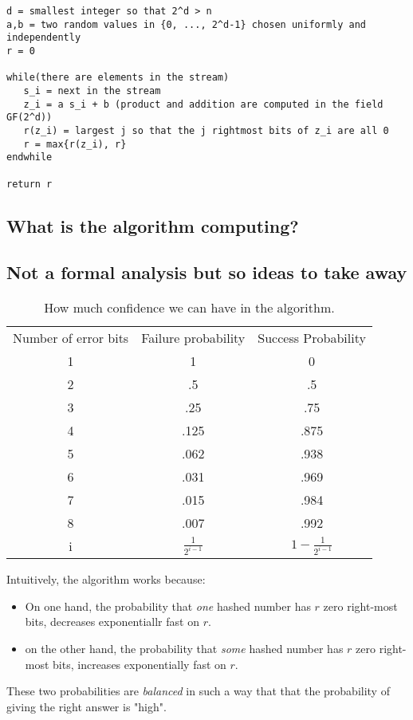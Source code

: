 \documentclass[12pt]{article}
\begin{document}
\begin{verbatim}
d = smallest integer so that 2^d > n
a,b = two random values in {0, ..., 2^d-1} chosen uniformly and independently
r = 0

while(there are elements in the stream)
   s_i = next in the stream
   z_i = a s_i + b (product and addition are computed in the field GF(2^d))
   r(z_i) = largest j so that the j rightmost bits of z_i are all 0
   r = max{r(z_i), r}       
endwhile

return r

\end{verbatim}



\subsection{What is the algorithm computing?}




\subsection{Not a formal analysis but so ideas to take away}
\begin{table}[htdp]

\begin{center}
\begin{tabular}{|c|c|c|}
Number of error bits & Failure probability & Success Probability \\
1 & 1 & 0 \\
2 & .5 & .5 \\
3 & .25 & .75 \\
4 & .125 & .875 \\
5 & .062 & .938 \\
6 & .031 & .969 \\
7 & .015 & .984 \\
8 & .007 & .992 \\
i & $\frac{1} {2^{i-1}}$ & $1- \frac {1} {2^{i-1}}$

\end{tabular}
\end{center}
\label{table}
\caption{How much confidence we can have in the algorithm.}
\end{table}%


Intuitively, the algorithm works because:
\begin{itemize}
\item On one hand, the probability that \emph{one} hashed number has $r$ zero right-most  bits, decreases exponentiallr fast on $r$.
\item on the other hand, the probability that \emph{some} hashed number has $r$ zero right-most bits, increases exponentially fast on $r$.
\end{itemize}
These two probabilities are \emph{balanced} in such a way that that the probability of giving the right answer is "high".
\end{document}
